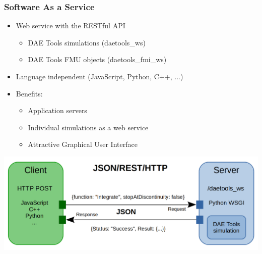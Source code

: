 \documentclass[compress,newPxFont,sthlmFooter]{beamer}
\begin{document}
\begin{frame}
\frametitle{Software As a Service}
    \begin{itemize}
      \item \alert{Web service with the RESTful API} 
        \begin{itemize}
          \item DAE Tools simulations (daetools\_ws)
          \item DAE Tools FMU objects (daetools\_fmi\_ws)
        \end{itemize}
      \item \alert{Language independent} (JavaScript, Python, C++, ...)
      \item \alert{Benefits}:
        \begin{itemize}
          \item Application servers
          \item Individual simulations as a web service
          \item Attractive Graphical User Interface
        \end{itemize}
    \end{itemize}
    \begin{center}
        \includegraphics[align=c, height=0.30\paperheight]{daetools_web_service.png}
    \end{center}
\end{frame}
\end{document}
